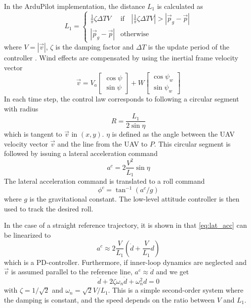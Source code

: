 In the ArduPilot implementation, the distance $L_1$ is calculated as
\begin{equation}\label{eq:ardu_l1}
    L_1=\begin{cases}
        \frac{1}{\pi}\zeta\Delta TV & \mbox{if}\quad |\frac{1}{\pi}\zeta\Delta TV|>|\vec{p}_g-\vec{p}| \\
        |\vec{p}_g-\vec{p}| & \mbox{otherwise}
    \end{cases}
\end{equation}
where $V=|\vec{v}|$, $\zeta$ is the damping factor and $\Delta T$ is the update period of the controller \cite{arduplane_l1}.
Wind effects are compensated by using the inertial frame velocity vector 
\begin{equation}
    \vec{v} = V_a\begin{bmatrix}
        \cos\psi \\
        \sin\psi
    \end{bmatrix}
    + W\begin{bmatrix}
        \cos\psi_w\\
        \sin\psi_w
    \end{bmatrix}
\end{equation}
 In each time step, the control law corresponds to following a circular segment with radius
 \begin{equation}
    R=\frac{L_1}{2\sin\eta}
 \end{equation}
 which is tangent to $\vec{v}$ in $(x,y)$.
 $\eta$ is defined as the angle between the UAV velocity vector $\vec{v}$ and the line from the UAV to $P$.
This circular segment is followed by issuing a lateral acceleration command
\begin{equation}\label{eq:lat_acc}
    a^{c}=2\frac{V^2}{L_1}\sin\eta
\end{equation}
The lateral acceleration command is translated to a roll command
\begin{equation}\label{eq:roll_cmd}
    \phi^{c}=\tan^{-1}(a^{c}/g)
\end{equation}
where $g$ is the gravitational constant. The low-level attitude controller is then used to track the desired roll.

In the case of a straight reference trajectory, it is shown in \cite{l1_controller} that \eqref{eq:lat_acc} 
can be linearized to
\begin{equation}
    a^c\approx2\frac{V}{L_1}\left(\dot{d}+\frac{V}{L_1}d\right)
\end{equation} 
which is a PD-controller. Furthermore, if inner-loop dynamics are neglected and 
$\vec{v}$ is assumed parallel to the reference line, $a^c\approx \ddot{d}$ and we get
\begin{equation}
    \ddot{d} + 2\zeta\omega_n\dot{d} + \omega_n^2d=0
\end{equation}
with $\zeta=1/\sqrt{2}$ and $\omega_n=\sqrt{2}V/L_1$. This is a simple second-order system where 
the damping is constant, and the speed depends on the ratio between $V$ and $L_1$. 
\iffalse
